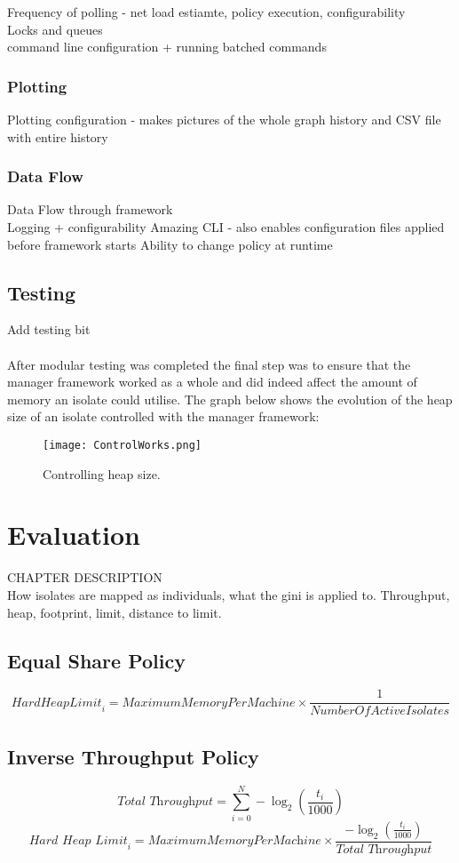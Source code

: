 \documentclass{l4proj}
\begin{document}
Frequency of polling - net load estiamte, policy execution, configurability
\\Locks and queues
\\command line configuration + running batched commands
\subsection{Plotting}
Plotting configuration - makes pictures of the whole graph history and CSV file with entire history
\subsection{Data Flow}
Data Flow through framework
\\Logging + configurability
Amazing CLI - also enables configuration files applied before framework starts
Ability to change policy at runtime
\section{Testing}
Add testing bit
\\\\
\hspace*{3em} After modular testing was completed the final step was to ensure that the manager framework worked as a whole and did indeed affect the amount of memory an isolate could utilise. The graph below shows the evolution of the heap size of an isolate controlled with the manager framework:
\begin{figure}[!ht]
  \centering
    \texttt{[image: ControlWorks.png]}
  \caption{Controlling heap size.}
\end{figure}

\chapter{Evaluation}
CHAPTER DESCRIPTION\\
How isolates are mapped as individuals, what the gini is applied to.
Throughput, heap, footprint, limit, distance to limit.
\section{Equal Share Policy}
\begin{equation}
\textit{HardHeapLimit}_i = \textit{MaximumMemoryPerMachine} \times \frac{1}{\textit{NumberOfActiveIsolates}}
\end{equation}
\section{Inverse Throughput Policy}
\begin{equation}
\textit{Total Throughput} = \sum_{i=0}^{N} -\log_2(\frac{t_i}{1000})
\end{equation}
\begin{equation}
\textit{Hard Heap Limit}_i = \textit{MaximumMemoryPerMachine} \times \frac{-\log_2(\frac{t_i}{1000})}{\textit{Total Throughput}}
\end{equation}
\end{document}
